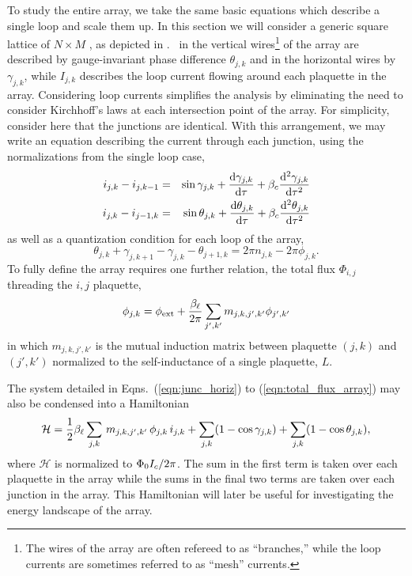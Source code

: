 To study the entire array, we take the same basic equations which describe
a single loop and scale them up.
In this section we will
consider a generic square lattice of $N \times M$ \jjsnoun, as depicted in 
. \jjsnoun\ in the vertical
wires\footnote{The wires of the array are often refereed to as ``branches,''
while the loop currents are sometimes referred to as ``mesh'' currents.}
of the array are described by gauge-invariant phase difference 
$\theta_{j,k}$ and in the horizontal
wires by $\gamma_{j,k}$, while $I_{j,k}$ describes the loop current flowing
around each plaquette in the array. Considering loop currents simplifies
the analysis by eliminating the need to consider Kirchhoff's laws at each
intersection point of the array. 
For simplicity, consider here that the junctions are identical. 
With this arrangement, we may write an 
equation describing the current through each junction, using the normalizations
from the single loop case,
%
\begin{eqnarray}
\label{eqn:junc_horiz}
i_{j,k}-i_{j,k-1} & = & \sin\gamma_{j,k} +  {\mathrm{d}\gamma_{j,k}\over\mathrm{d}\tau}
                        + \beta_c {\mathrm{d}^2\gamma_{j,k}\over\mathrm{d}\tau^2} \\
i_{j,k}-i_{j-1,k} & = & \sin\theta_{j,k} + {\mathrm{d}\theta_{j,k}\over\mathrm{d}\tau} 
                        + \beta_c {\mathrm{d}^2\theta_{j,k}\over\mathrm{d}\tau^2} 
\label{eqn:junc_vert}
\end{eqnarray}
% 
as well as a quantization condition for each loop of the array,
%
\begin{equation}
\theta_{j,k} + \gamma_{j,k+1} - \gamma_{j,k} - \theta_{j+1,k} = 
 2 \pi n_{j,k} - 2 \pi \phi_{j,k} . 
\end{equation}
%
To fully define the array requires one further relation, the total flux
$\Phi_{i,j}$
threading the $i,j$ plaquette,
%
\begin{equation}
\phi_{j,k} = \phi_{\mathrm{ext}} +{\beta_\ell\over 2 \pi} 
       \sum_{j',k'} m_{j,k,j',k'} \phi_{j',k'}
\label{eqn:total_flux_array}
\end{equation}
%
in which $m_{j,k,j',k'}$ is the mutual induction matrix between plaquette
$(j,k)$ and $(j',k')$ normalized to the self-inductance of a single plaquette,
$L$. 

The system detailed in Eqns.~(\ref{eqn:junc_horiz}) to 
(\ref{eqn:total_flux_array}) may also be condensed into a Hamiltonian
%
\begin{equation}
\mathcal{H} = \frac{1}{2}\beta_\ell 
           \sum_{j,k}\,m_{j,k,j',k'}\,{\phi}_{j,k}\, i_{j,k}
    + \sum_{j,k} (1-\cos\gamma_{j,k})
    + \sum_{j,k} (1-\cos\theta_{j,k}),
\label{eqn:array_hamiltonian}
\end{equation}
%
where $\mathcal{H}$ is normalized to $\Phi_0 I_c / 2 \pi$. 
The sum in the first term is taken over each plaquette in the array while
the sums in the final two terms are taken over each junction in the array. 
This Hamiltonian will later be useful for investigating the energy 
landscape of the array. 

